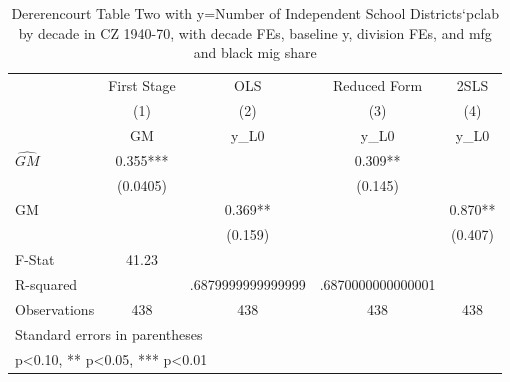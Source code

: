 \begin{table}[htbp]\centering
\def\sym#1{\ifmmode^{#1}\else\(^{#1}\)\fi}
\caption{Dererencourt Table Two with y=Number of Independent School Districts`pclab by decade in CZ 1940-70, with decade FEs, baseline y, division FEs, and mfg and black mig share}
\begin{tabular}{l*{4}{c}}
\toprule
                    & First Stage   &         OLS   &Reduced Form   &        2SLS   \\
                    &\multicolumn{1}{c}{(1)}&\multicolumn{1}{c}{(2)}&\multicolumn{1}{c}{(3)}&\multicolumn{1}{c}{(4)}\\
                    &\multicolumn{1}{c}{GM}&\multicolumn{1}{c}{y\_L0}&\multicolumn{1}{c}{y\_L0}&\multicolumn{1}{c}{y\_L0}\\
\midrule
$\hat{GM}$          &       0.355***&               &       0.309** &               \\
                    &    (0.0405)   &               &     (0.145)   &               \\
\addlinespace
GM                  &               &       0.369** &               &       0.870** \\
                    &               &     (0.159)   &               &     (0.407)   \\
\midrule
F-Stat              &       41.23   &               &               &               \\
R-squared           &               &.6879999999999999   &.6870000000000001   &               \\
Observations        &         438   &         438   &         438   &         438   \\
\bottomrule
\multicolumn{5}{l}{\footnotesize Standard errors in parentheses}\\
\multicolumn{5}{l}{\footnotesize * p<0.10, ** p<0.05, *** p<0.01}\\
\end{tabular}
\end{table}
